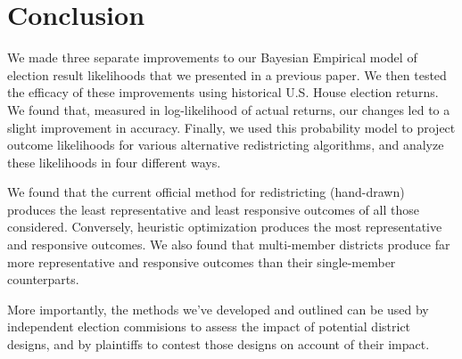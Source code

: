 \documentclass[preprint,12pt]{article}
\begin{document}
\section{Conclusion}

We made three separate improvements to our Bayesian Empirical model of election result likelihoods that we presented in a previous paper.  We then tested the efficacy of these improvements using historical U.S. House election returns.  We found that, measured in log-likelihood of actual returns, our changes led to a slight improvement in accuracy.  Finally, we used this probability model to project outcome likelihoods for various alternative redistricting algorithms, and analyze these likelihoods in four different ways.

We found that the current official method for redistricting (hand-drawn) produces the least representative and least responsive outcomes of all those considered.  Conversely, heuristic optimization produces the most representative and responsive outcomes.  We also found that multi-member districts produce far more representative and responsive outcomes than their single-member counterparts.

More importantly, the methods we've developed and outlined can be used by independent election commisions to assess the impact of potential district designs, and by plaintiffs to contest those designs on account of their impact.



\clearpage
\end{document}
